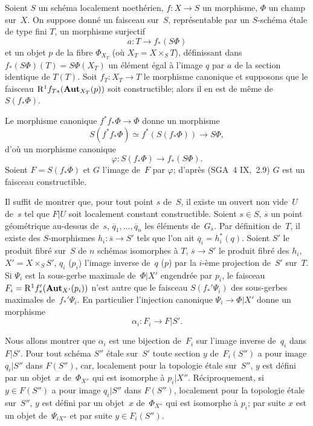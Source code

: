 \begin{sublemme}
\label{XIII.6.1.1}
Soient $S$ un sch\'ema localement noeth\'erien, $f\colon X\to S$
un morphisme, $\Phi$ un champ sur~$X$. On suppose donn\'e un faisceau
sur~$S$, repr\'esentable par un $S$-sch\'ema \'etale de type
fini $T$, un morphisme surjectif
$$
a\colon T\to f_*(S\Phi )
$$
et un objet $p$ de la fibre $\Phi_{X_T}$ (o\`u $X_T=X\times_ST$),
d\'efinissant dans $f_*(S\Phi )(T)= S\Phi (X_T)$ un \'el\'ement
\'egal \`a l'image $q$ par $a$ de la section identique de
$T(T)$. Soit $f_T\colon X_T\to T$ le morphisme canonique et supposons
que le faisceau $\mathrm{R}^1f_{T*}(\operatorname{\mathbf{Aut}}_{X_T}(p))$ soit constructible;
alors il en est de m\^eme de~$S(f_*\Phi )$.
\end{sublemme}

Le morphisme canonique $f^*f_*\Phi\to\Phi$ donne un morphisme
$$
S(f^*f_*\Phi )\simeq f^*(S(f_*\Phi ))\to S\Phi ,
$$
d'o\`u un morphisme canonique
$$
\varphi\colon S(f_*\Phi )\to f_*(S\Phi ).
$$
Soient
$F=S(f_*\Phi )$ et $G$ l'image de~$F$ par $\varphi$; d'apr\`es
(SGA~4 IX,~2.9) $G$ est un faisceau constructible.

Il suffit de montrer que, pour tout point $s$ de~$S$, il existe un
ouvert non vide~$U$ de~$s$ tel que $F|U$ soit localement constant
constructible. Soient $s\in S$, $\overline{s}$ un point
g\'eom\'etrique au-dessus de~$s$, $\overline{q}_1,\dots,\overline{q}_n$ les \'el\'ements de~$G_{\overline{s}}$. Par
d\'efinition de~$T$, il existe des $S$-morphismes
$h_i\colon\overline{s}\to S'$ tels que l'on ait
$\overline{q}_i=h_i^*(q)$. Soient $S'$ le produit fibr\'e sur~$S$ de
$n$ sch\'emas isomorphes \`a $T$, $\overline{s}\to S'$ le produit
fibr\'e des $h_i$, $X'=X\times_SS'$, $q_i$ (\resp $p_i$) l'image
inverse de~$q$ (\resp $p$) par la $i$-\`eme projection de~$S'$ sur~$T$. Si $\Psi_i$ est la sous-gerbe maximale de~$\Phi|X'$
engendr\'ee par $p_i$, le faisceau
$F_i=\mathrm{R}^1f_*'(\operatorname{\mathbf{Aut}}_{X'}(p_i))$ n'est autre que le faisceau
$S(f_*'\Psi_i)$ des sous-gerbes maximales de~$f_*'\Psi_i$. En
particulier l'injection canonique $\Psi_i\to\Phi |X'$ donne un
morphisme
$$
\alpha_i\colon F_i\to F|S'.
$$

Nous allons montrer que $\alpha_i$ est une bijection de~$F_i$ sur
l'image inverse de~$q_i$ dans $F|S'$. Pour tout sch\'ema $S''$
\'etale sur~$S'$ toute section $y$ de~$F_i(S'')$ a pour image
$q_i|S''$ dans $F(S'')$, car, localement pour la topologie \'etale
sur~$S''$, $y$ est d\'efini par un objet~$x$ de~$\Phi_{X''}$ qui est
isomorphe \`a $p_i|X''$. R\'eciproquement, si $y\in F(S'')$ a pour
image $q_i|S''$ dans $F(S'')$, localement pour la topologie \'etale
sur~$S''$, $y$ est d\'efini par un objet~$x$ de~$\Phi_{X''}$ qui est
isomorphe \`a $p_i$; par suite $x$ est un objet de~$\Psi_{iX''}$ et
par suite $y\in F_i(S'')$.

